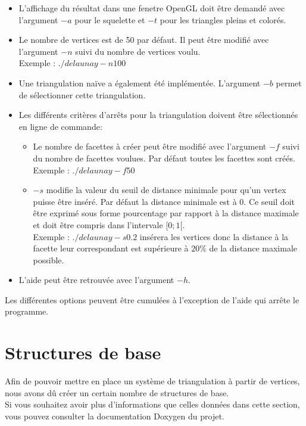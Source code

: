 \documentclass{article}
\begin{document}
    \begin{itemize}
    \item L'affichage du résultat dans une fenetre OpenGL doit être demandé avec l'argument $-a$ pour le squelette et $-t$ pour les triangles pleins et colorés.
    \item Le nombre de vertices est de 50 par défaut. Il peut être modifié avec l'argument $-n$ suivi du nombre de vertices voulu. 
    \\Exemple : $./delaunay -n100$
    \item Une triangulation naïve a également été implémentée. L'argument $-b$ permet de sélectionner cette triangulation. 
    \item Les différents critères d'arrêts pour la triangulation doivent être sélectionnés en ligne de commande:
        \begin{itemize}
        \item Le nombre de facettes à créer peut être modifié avec l'argument $-f$ suivi du nombre de facettes voulues. Par défaut toutes les facettes sont créés.
        \\Exemple : $./delaunay -f50$
        \item $-s$ modifie la valeur du seuil de distance minimale pour qu'un vertex puisse être inséré. Par défaut la distance minimale est à $0$. Ce seuil doit être exprimé sous forme pourcentage par rapport à la distance maximale et doit être compris dans l'intervale $[0;1[$.
        \\Exemple : $./delaunay -s0.2$ insérera les vertices donc la distance à la facette leur correspondant est supérieure à $20\%$ de la distance maximale possible.
        \end{itemize}
    \item L'aide peut être retrouvée avec l'argument $-h$.
    \end{itemize}
    
    Les différentes options peuvent être cumulées à l'exception de l'aide qui arrête le programme.
    
\section{Structures de base}
        Afin de pouvoir mettre en place un système de triangulation à partir de vertices, nous avons dû créer un certain nombre de structures de base.
        \\Si vous souhaitez avoir plus d'informations que celles données dans cette section, vous pouvez consulter la documentation Doxygen du projet.
\end{document}
